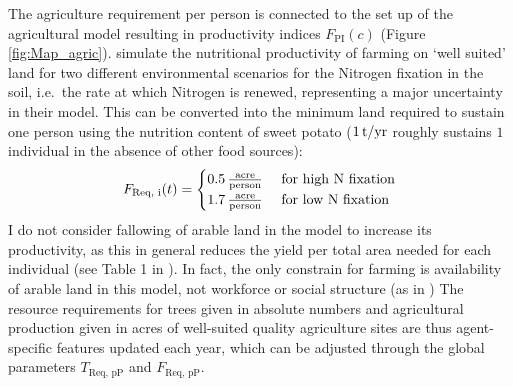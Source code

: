 The agriculture requirement per person is connected to the set up of the agricultural model resulting in productivity indices $F_\text{PI}(c)$ (Figure \ref{fig:Map_agric}).
\citet{Puleston2017} simulate the nutritional productivity of farming on `well suited' land for two different environmental scenarios for the Nitrogen fixation in the soil, i.e.\ the rate at which Nitrogen is renewed, representing a major uncertainty in their model.
This can be converted into the minimum land required to sustain one person using the nutrition content of sweet potato ($1\, \rm{t/yr}$ roughly sustains $1$ individual in the absence of other food sources): 
\begin{equation}
F_\text{Req, i}(t) = \begin{cases}
	0.5 \, {\rm \frac{acre}{person} } & \text{ for high N fixation} \\
	1.7 \, {\rm \frac{acre}{person} } & \text{ for low N fixation} \\
 \end{cases}
\end{equation}
I do not consider fallowing of arable land in the model to increase its productivity, as this in general reduces the yield per total area needed for each individual (see Table 1 in \citet{Puleston2017}).
In fact, the only constrain for farming is availability of arable land in this model, not workforce or social structure (as in \citet{Puleston2017})
The resource requirements for trees given in absolute numbers and agricultural production given in acres of well-suited quality agriculture sites are thus agent-specific features updated each year, which can be adjusted through the global parameters $T_\text{Req, pP}$ and $F_\text{Req, pP}$.

